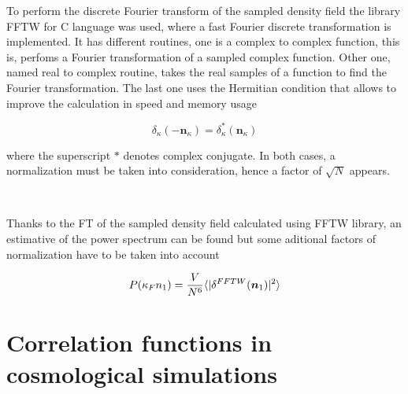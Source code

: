 To perform the discrete Fourier transform of the sampled density field the library 
FFTW for C language was used, where a fast Fourier discrete transformation is implemented.
It has different routines, one is a complex to complex function, this is, perfoms a 
Fourier transformation of a sampled complex function. Other one, named real to complex routine, 
takes the real samples of a function to find the Fourier transformation. The last one 
uses the Hermitian condition that allows to improve the calculation in speed and memory 
usage

\[\delta_\kappa(-\textbf{n}_\kappa) = \delta_\kappa^*(\textbf{n}_\kappa)\]

where the superscript $*$ denotes complex conjugate. In both cases, a normalization 
must be taken into consideration, hence a factor of $\sqrt{N}$ appears.

\

Thanks to the FT of the sampled density field calculated using FFTW library, an 
estimative of the power spectrum can be found but some aditional factors of normalization 
have to be taken into account \cite{Djeong}

\begin{equation}
P(\kappa_F n_1) = \frac{V}{N^6}\langle|\delta^{FFTW}(\mbox{\boldmath$n$}_1)|^2\rangle
\end{equation} 




\section{ Correlation functions in cosmological simulations }

